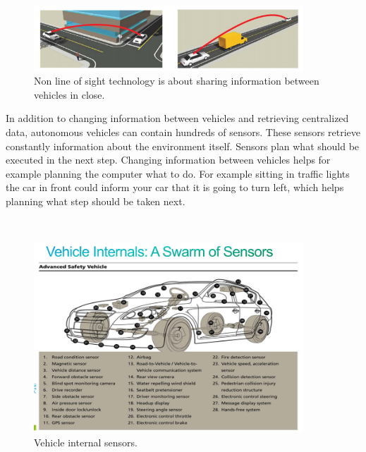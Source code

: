 \documentclass[english]{tktltiki}
\begin{document}
\begin{figure}[h]
\ \newline
\begin{center}
\includegraphics[width=0.9\textwidth]{nonlineofsight.png}
\caption{Non line of sight technology is about sharing information between vehicles in close. 
\cite{connectedvehicle}}
\label{non line of sight}
\end{center}
\end{figure}

In addition to changing information between vehicles and retrieving centralized 
data, \cite{trafficmodels} autonomous vehicles can contain hundreds of sensors. These sensors 
retrieve constantly information about the environment itself. Sensors plan what 
should be executed in the next step. Changing information between vehicles helps 
for example planning the computer what to do. For example sitting in traffic 
lights the car in front could inform your car that it is going to turn left, 
which helps planning what step should be  taken next. 

\begin{figure}[h]
\ \newline
\begin{center}
\includegraphics[width=0.9\textwidth]{vehicleinternals.png}
\caption{Vehicle internal sensors. 
\cite{connectedvehicle}}
\label{sensors}
\end{center}
\end{figure}
\end{document}
